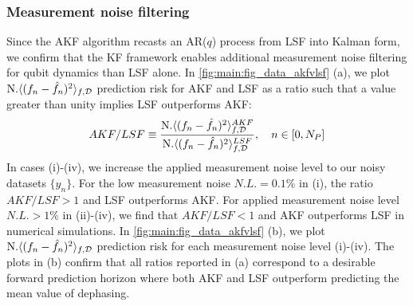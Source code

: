 \subsubsection{Measurement noise filtering}
Since the AKF algorithm recasts an AR($q$) process from LSF into Kalman form, we confirm that the KF framework enables additional measurement noise filtering for qubit dynamics than LSF alone. In \cref{fig:main:fig_data_akfvlsf} (a), we plot $\text{N.} \langle (f_n - \hat{f}_n)^2 \rangle_{f, \mathcal{D}}$ prediction risk for AKF and LSF as a ratio such that a value greater than unity implies LSF outperforms AKF:
\begin{align}
AKF / LSF \equiv \frac{\text{N.} \langle (f_n - \hat{f}_n)^2 \rangle_{f, \mathcal{D}} ^{AKF}}{\text{N.} \langle (f_n - \hat{f}_n)^2 \rangle_{f, \mathcal{D}}^{LSF}}, \quad n \in [0, N_P]
\end{align}
In cases (i)-(iv), we increase the applied measurement noise level to our noisy datasets $\{ y_n \}$. For the low measurement noise $N.L. = 0.1\%$ in (i), the ratio $AKF/LSF > 1$ and LSF outperforms AKF. For applied measurement noise level $N.L. > 1\%$ in (ii)-(iv), we find that $AKF/LSF <1 $ and AKF outperforms LSF in numerical simulations. In \cref{fig:main:fig_data_akfvlsf} (b), we plot $\text{N.} \langle (f_n - \hat{f}_n)^2 \rangle_{f, \mathcal{D}}$ prediction risk for each measurement noise level (i)-(iv). The plots in (b) confirm that all ratios reported in (a) correspond to a desirable forward prediction horizon where both AKF and LSF outperform predicting the mean value of dephasing. 

